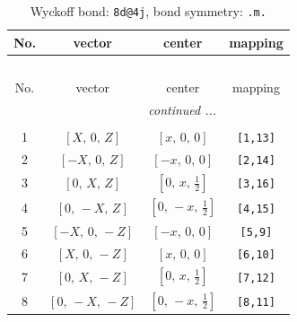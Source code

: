 \documentclass[fleqn,8pt]{jsarticle}
\begin{document}
\begin{longtable}{cccc}
\caption{Wyckoff bond: {\tt 8d@4j}, bond symmetry: {\tt .m.}}
 \\
 \hline \hline
No. & vector & center & mapping \\ \hline \endfirsthead

\multicolumn{3}{l}{\tablename\ \thetable{}} \\
 \hline \hline
No. & vector & center & mapping \\ \hline \endhead

 \hline \hline
\multicolumn{3}{r}{\footnotesize\it continued ...} \\ \endfoot

 \hline \hline
\multicolumn{3}{r}{} \\ \endlastfoot

1 & $\left[ X,\, 0,\, Z \right]$ & $\left[ x,\, 0,\, 0 \right]$ & {\tt [1,13]} \\ \hline
2 & $\left[ - X,\, 0,\, Z \right]$ & $\left[ - x,\, 0,\, 0 \right]$ & {\tt [2,14]} \\ \hline
3 & $\left[ 0,\, X,\, Z \right]$ & $\left[ 0,\, x,\, \frac{1}{2} \right]$ & {\tt [3,16]} \\ \hline
4 & $\left[ 0,\, - X,\, Z \right]$ & $\left[ 0,\, - x,\, \frac{1}{2} \right]$ & {\tt [4,15]} \\ \hline
5 & $\left[ - X,\, 0,\, - Z \right]$ & $\left[ - x,\, 0,\, 0 \right]$ & {\tt [5,9]} \\ \hline
6 & $\left[ X,\, 0,\, - Z \right]$ & $\left[ x,\, 0,\, 0 \right]$ & {\tt [6,10]} \\ \hline
7 & $\left[ 0,\, X,\, - Z \right]$ & $\left[ 0,\, x,\, \frac{1}{2} \right]$ & {\tt [7,12]} \\ \hline
8 & $\left[ 0,\, - X,\, - Z \right]$ & $\left[ 0,\, - x,\, \frac{1}{2} \right]$ & {\tt [8,11]} \\
\end{longtable}
\renewcommand{\arraystretch}{1.2}
\end{document}
